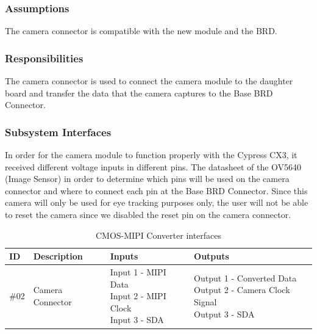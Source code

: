 \subsubsection{Assumptions}
The camera connector is compatible with the new module and the BRD.

\subsubsection{Responsibilities}
The camera connector is used to connect the camera module to the daughter board and transfer the data that the camera captures to the Base BRD Connector.

\subsubsection{Subsystem Interfaces}
In order for the camera module to function properly with the Cypress CX3, it received different voltage inputs in different pins. The datasheet of the OV5640 (Image Sensor) in order to determine which pins will be used on the camera connector and where to connect each pin at the Base BRD Connector. Since this camera will only be used for eye tracking purposes only, the user will not be able to reset the camera since we disabled the reset pin on the camera connector.

\begin {table}[H]
\caption {CMOS-MIPI Converter interfaces}
\begin{center}
    \begin{tabular}{ | p{1cm} | p{6cm} | p{3cm} | p{3cm} |}
    \hline
    ID & Description & Inputs & Outputs \\ \hline
    \#02 & Camera Connector & \pbox{3cm}{Input 1 - MIPI Data \\ Input 2 - MIPI Clock \\ Input 3 - SDA} & \pbox{3cm}{Output 1 - Converted Data \\ Output 2 - Camera Clock Signal \\ Output 3 - SDA}  \\ \hline
    \end{tabular}
\end{center}
\end{table}
